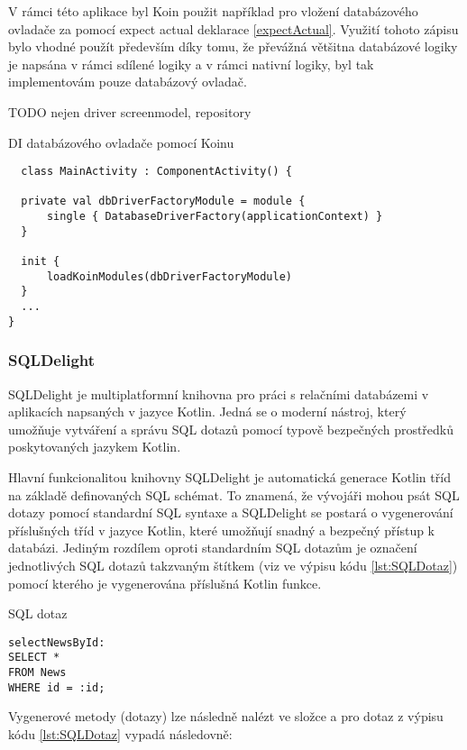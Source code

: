 \bigskip

V rámci této aplikace byl Koin použit například pro vložení databázového ovladače za pomocí expect actual deklarace \ref{expectActual}.
Využití tohoto zápisu bylo vhodné použít především díky tomu, že převážná většitna databázové logiky je napsána v rámci sdílené 
logiky a v rámci nativní logiky, byl tak implementovám pouze databázový ovladač.

TODO nejen driver screenmodel, repository
\begin{listing}
\caption{DI databázového ovladače pomocí Koinu}\label{lst:KoinInit}
\begin{verbatim}
  class MainActivity : ComponentActivity() {

  private val dbDriverFactoryModule = module {
      single { DatabaseDriverFactory(applicationContext) }
  }

  init {
      loadKoinModules(dbDriverFactoryModule)
  }
  ...
}
\end{verbatim}
\end{listing}

\subsubsection*{SQLDelight}
SQLDelight je multiplatformní knihovna pro práci s relačními databázemi v aplikacích napsaných v jazyce Kotlin. Jedná se o moderní nástroj, 
který umožňuje vytváření a správu SQL dotazů pomocí typově bezpečných prostředků poskytovaných jazykem Kotlin.

Hlavní funkcionalitou knihovny SQLDelight je automatická generace Kotlin tříd na základě definovaných SQL schémat. To znamená, že vývojáři
 mohou psát SQL dotazy pomocí standardní SQL syntaxe a SQLDelight se postará o vygenerování příslušných tříd v jazyce Kotlin, které umožňují 
 snadný a bezpečný přístup k databázi. Jediným rozdílem oproti standardním SQL dotazům je označení jednotlivých SQL dotazů takzvaným 
 štítkem (viz  ve výpisu kódu \ref{lst:SQLDotaz}) pomocí kterého je vygenerována příslušná Kotlin funkce. 

\begin{listing}
\caption{SQL dotaz}\label{lst:SQLDotaz}
\begin{verbatim}
selectNewsById:
SELECT *
FROM News
WHERE id = :id;
\end{verbatim}
\end{listing}


Vygenerové metody (dotazy) lze následně nalézt ve složce  a pro dotaz z výpisu kódu \ref{lst:SQLDotaz}
vypadá následovně:

